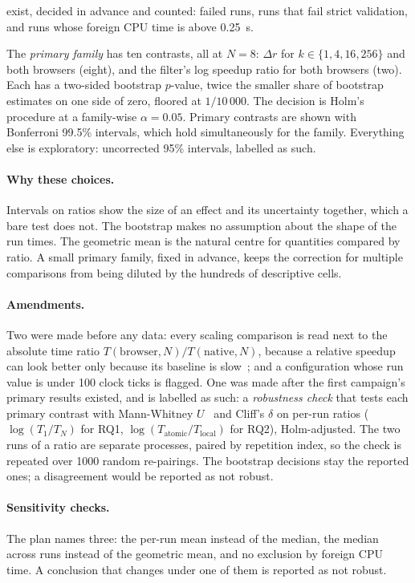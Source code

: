 \begin{description}[leftmargin=2.5em]
exist, decided in advance and counted: failed runs, runs that fail strict
validation, and runs whose foreign CPU time is above 0.25~s.
\item[D8, multiple comparisons.] The \emph{primary family} has ten
contrasts, all at $N=8$: $\Delta r$ for $k \in \{1,4,16,256\}$ and both
browsers (eight), and the filter's log speedup ratio for both browsers
(two). Each has a two-sided bootstrap $p$-value, twice the smaller share of
bootstrap estimates on one side of zero, floored at $1/10\,000$. The
decision is Holm's procedure at a family-wise $\alpha=0.05$. Primary
contrasts are shown with Bonferroni 99.5\% intervals, which hold
simultaneously for the family. Everything else is exploratory: uncorrected
95\% intervals, labelled as such.
\end{description}

\paragraph{Why these choices.} Intervals on ratios show the size of an
effect and its uncertainty together, which a bare test does not. The
bootstrap makes no assumption about the shape of the run times. The
geometric mean is the natural centre for quantities compared by ratio. A
small primary family, fixed in advance, keeps the correction for multiple
comparisons from being diluted by the hundreds of descriptive cells.

\paragraph{Amendments.} Two were made before any data: every scaling
comparison is read next to the absolute time ratio
$T(\mathrm{browser},N)/T(\mathrm{native},N)$, because a relative speedup can
look better only because its baseline is slow~\cite{hoefler2015}; and a
configuration whose run value is under 100 clock ticks is flagged. One was
made after the first campaign's primary results existed, and is labelled as
such: a \emph{robustness check} that tests each primary contrast with
Mann-Whitney $U$~\cite{mann1947} and Cliff's $\delta$ on per-run ratios
($\log(T_1/T_N)$ for RQ1, $\log(T_{\mathrm{atomic}}/T_{\mathrm{local}})$ for
RQ2), Holm-adjusted. The two runs of a ratio are separate processes, paired
by repetition index, so the check is repeated over 1000 random re-pairings.
The bootstrap decisions stay the reported ones; a disagreement would be
reported as not robust.

\paragraph{Sensitivity checks.} The plan names three: the per-run mean
instead of the median, the median across runs instead of the geometric
mean, and no exclusion by foreign CPU time. A conclusion that changes under
one of them is reported as not robust.

